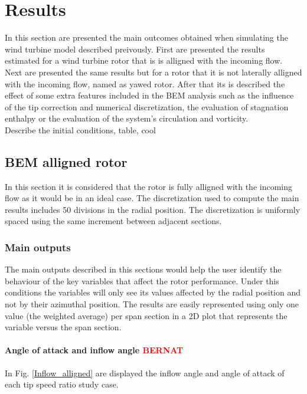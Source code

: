 \chapter{Results}

In this section are presented the main outcomes obtained when simulating the wind turbine model described preivously.  First are presented the results estimated for a wind turbine rotor that is is alligned with the incoming flow. Next are presented the same results but for a rotor that it is not laterally alligned with the incoming flow, named as yawed rotor. After that its is described the effect of some extra features included in the BEM analysis such as the influence of the tip correction and numerical discretization, the evaluation of stagnation enthalpy or the evaluation of the system's circulation and vorticity.\\

Describe the initial conditions, table, cool


\section{BEM alligned rotor}

In this section it is considered that the rotor is fully alligned with the incoming flow as it would be in an ideal case. The discretization used to compute the main results includes 50 divisions in the radial position. The discretization is uniformly spaced using the same increment between adjacent sections.  

\subsection{Main outputs }

The main outputs described in this sections would help the user identify the behaviour of the key variables that affect the rotor performance. Under this conditions the variables will only see its values affected by the radial position and not by their azimuthal position. The results are easily represented using only one value (the weighted average) per span section in a 2D plot that represents the variable versus the span section.  

\subsubsection{\textbf{Angle of attack and inflow angle}  \textcolor{red}{BERNAT}}

In Fig. \ref{Inflow_alligned} are displayed the inflow angle and angle of attack of each tip speed ratio study case. 

